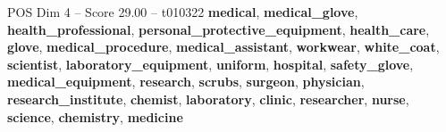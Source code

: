 \begin{textsample}{POS Dim 4 – Score 29.00 – t010322}  \label{ex:f4_pos_023}
\textbf{medical}, \textbf{medical\_glove}, \textbf{health\_professional}, \textbf{personal\_protective\_equipment}, \textbf{health\_care}, \textbf{glove}, \textbf{medical\_procedure}, \textbf{medical\_assistant}, \textbf{workwear}, \textbf{white\_coat}, \textbf{scientist}, \textbf{laboratory\_equipment}, \textbf{uniform}, \textbf{hospital}, \textbf{safety\_glove}, \textbf{medical\_equipment}, \textbf{research}, \textbf{scrubs}, \textbf{surgeon}, \textbf{physician}, \textbf{research\_institute}, \textbf{chemist}, \textbf{laboratory}, \textbf{clinic}, \textbf{researcher}, \textbf{nurse}, \textbf{science}, \textbf{chemistry}, \textbf{medicine}

\end{textsample}
